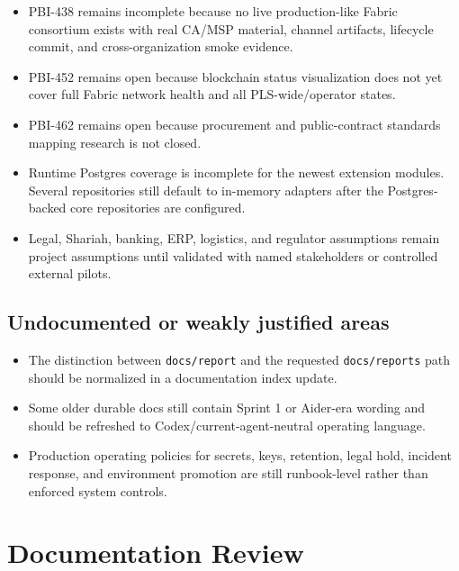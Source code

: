 \documentclass[11pt,a4paper]{article}
\newcommand{\repo}[1]{\texttt{#1}}
\begin{document}
\begin{itemize}
  \item PBI-438 remains incomplete because no live production-like Fabric consortium exists with real CA/MSP material, channel artifacts, lifecycle commit, and cross-organization smoke evidence.
  \item PBI-452 remains open because blockchain status visualization does not yet cover full Fabric network health and all PLS-wide/operator states.
  \item PBI-462 remains open because procurement and public-contract standards mapping research is not closed.
  \item Runtime Postgres coverage is incomplete for the newest extension modules. Several repositories still default to in-memory adapters after the Postgres-backed core repositories are configured.
  \item Legal, Shariah, banking, ERP, logistics, and regulator assumptions remain project assumptions until validated with named stakeholders or controlled external pilots.
\end{itemize}

\subsection{Undocumented or weakly justified areas}

\begin{itemize}
  \item The distinction between \repo{docs/report} and the requested \repo{docs/reports} path should be normalized in a documentation index update.
  \item Some older durable docs still contain Sprint 1 or Aider-era wording and should be refreshed to Codex/current-agent-neutral operating language.
  \item Production operating policies for secrets, keys, retention, legal hold, incident response, and environment promotion are still runbook-level rather than enforced system controls.
\end{itemize}

\section{Documentation Review}
\end{document}
